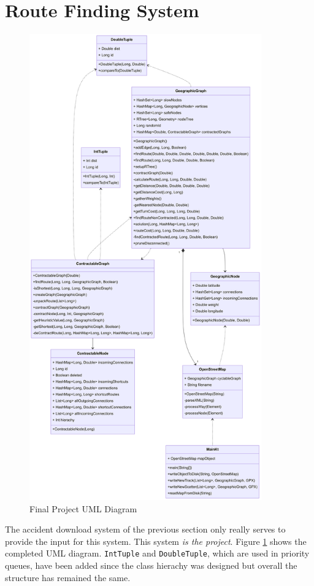 \documentclass[11pt,twoside,a4paper]{report}
\begin{document}
\section{Route Finding System}
\begin{figure}
    \begin{center}
        \includegraphics[width=10cm]{finaluml.png}
    \end{center}
    \caption{Final Project UML Diagram}
    \label{finaluml}
\end{figure}
The accident download system of the previous section only really serves to provide the input for this system. This system \textit{is the project}. Figure \ref{finaluml} shows the completed UML diagram. \texttt{IntTuple} and \texttt{DoubleTuple}, which are used in priority queues,  have been added since the class hierachy was designed but overall the structure has remained the same.
\end{document}
